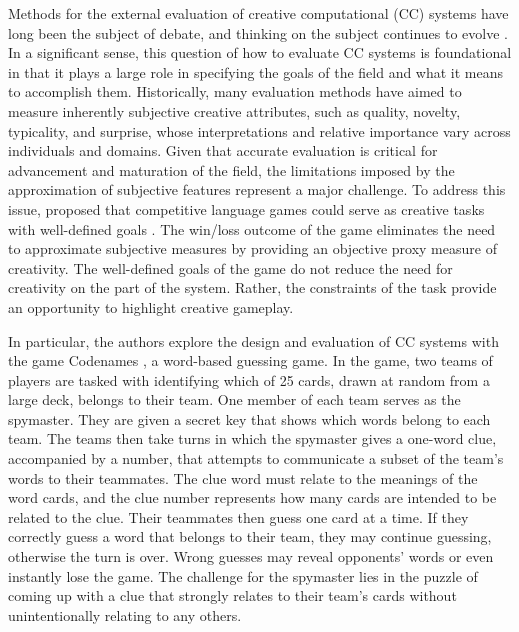 \documentclass[phd,electronic,oneside,twosidetoc,letterpaper,chaptercenter,parttop,lof]{byumsphd}
\begin{document}
Methods for the external evaluation of creative computational (CC) systems have long been the subject of debate, and thinking on the subject continues to evolve \cite{ritchie07,pease2011face,jordanous2012standardised,bown2014,lamb2015,ventura2016mere,carnovalini2021,peeperkorn2023}.
In a significant sense, this question of how to evaluate CC systems is foundational in that it plays a large role in specifying the goals of the field and what it means to accomplish them.  Historically, many evaluation methods have aimed to measure inherently subjective creative attributes, such as quality, novelty, typicality, and surprise, whose interpretations and relative importance vary across individuals and domains. Given that accurate evaluation is critical for advancement and maturation of the field, the limitations imposed by the approximation of subjective features represent a major challenge.  To address this issue, \citeauthor{spendlove2022competitive} proposed that competitive language games could serve as creative tasks with well-defined goals \cite{spendlove2022competitive}. The win/loss outcome of the game eliminates the need to approximate subjective measures by providing an objective proxy measure of creativity. The well-defined goals of the game do not reduce the need for creativity on the part of the system. Rather, the constraints of the task provide an opportunity to highlight creative gameplay.

In particular, the authors explore the design and evaluation of CC systems with the game Codenames \cite{codenames2015}, a word-based guessing game. In the game, two teams of players are tasked with identifying which of 25 cards, drawn at random from a large deck, belongs to their team. One member of each team serves as the spymaster. They are given a secret key that shows which words belong to each team.  The teams then take turns in which the spymaster gives a one-word clue, accompanied by a number, that attempts to communicate a subset of the team's words to their teammates. The clue word must relate to the meanings of the word cards, and the clue number represents how many cards are intended to be related to the clue. Their teammates then guess one card at a time. If they correctly guess a word that belongs to their team, they may continue guessing, otherwise the turn is over. Wrong guesses may reveal opponents' words or even instantly lose the game. The challenge for the spymaster lies in the puzzle of coming up with a clue that strongly relates to their team's cards without unintentionally relating to any others.
\end{document}
